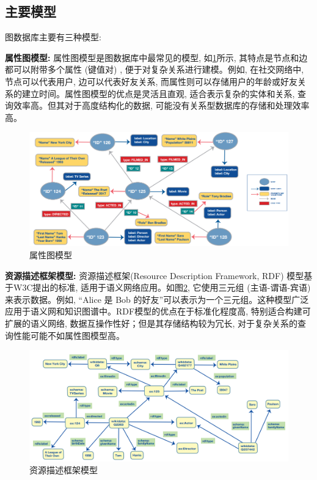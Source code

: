 \subsection{主要模型}

图数据库主要有三种模型:

\textbf{属性图模型:} 属性图模型是图数据库中最常见的模型, 如\cref{fig:property-graph}所示, 其特点是节点和边都可以附带多个属性 (键值对) , 便于对复杂关系进行建模。例如, 在社交网络中, 节点可以代表用户, 边可以代表好友关系, 而属性则可以存储用户的年龄或好友关系的建立时间。属性图模型的优点是灵活且直观, 适合表示复杂的实体和关系, 查询效率高。但其对于高度结构化的数据, 可能没有关系型数据库的存储和处理效率高。
\begin{figure}[H]
	\centering
	\includegraphics[width=\textwidth]{images/9.png}
	\caption{属性图模型}
	\label{fig:property-graph}
\end{figure}

\textbf{资源描述框架模型:} 资源描述框架(Resource Description Framework, RDF) 模型基于W3C提出的标准, 适用于语义网络应用。如图\cref{fig:rdf}, 它使用三元组 (主语-谓语-宾语) 来表示数据。例如, “Alice 是 Bob 的好友”可以表示为一个三元组。这种模型广泛应用于语义网和知识图谱中。RDF模型的优点在于标准化程度高, 特别适合构建可扩展的语义网络, 数据互操作性好；但是其存储结构较为冗长, 对于复杂关系的查询性能可能不如属性图模型高。
\begin{figure}[H]
	\centering
	\includegraphics[width=\textwidth]{images/10.png}
	\caption{资源描述框架模型}
	\label{fig:rdf}
\end{figure}

